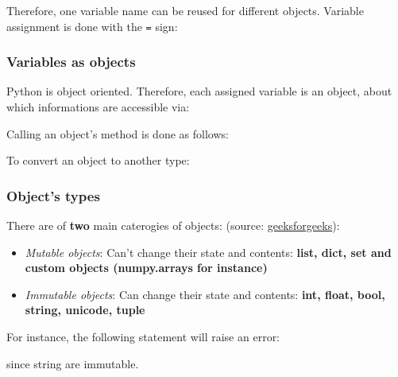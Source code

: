 \begin{frame}[fragile]
    Therefore, one variable name can be reused for different objects. Variable assignment is done with the \verb+=+ sign:
    

\end{frame}


\begin{frame}[fragile]
    \frametitle{Variables as objects}

    Python is object oriented. Therefore, each assigned variable is an object, about which informations are accessible via:
    

    \vspace{1em}
    Calling an object's method is done as follows:
    

    \vspace{1em}
    To convert an object to another type:
    

\end{frame}
    
\begin{frame}[fragile]
    \frametitle{Object's types}

    There are of \textbf{two} main caterogies of objects: (source: \href{https://www.geeksforgeeks.org/mutable-vs-immutable-objects-in-python/}{geeksforgeeks}): \\
    \begin{itemize}
        \item{\emph{Mutable objects}: Can't change their state and contents: \textbf{list, dict, set and custom objects (numpy.arrays for instance)}}
        \item{\emph{Immutable objects}: Can change their state and contents: \textbf{int, float, bool, string, unicode, tuple}}
    \end{itemize}

    \vspace{1em}
    For instance, the following statement will raise an error:
    

    since string are immutable.

\end{frame}
